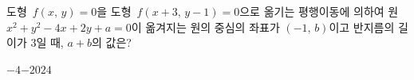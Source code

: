 도형~$f(x,\,y)=0$을 도형~$f(x+3,\,y-1)=0$으로 옮기는 평행이동에 의하여 원~$x^2+y^2-4x+2y+a=0$이 옮겨지는 원의 중심의 좌표가 $(-1,\,b)$이고 반지름의 길이가 $3$일 때, $a+b$의 값은? 
\begin{choices32}{$-4$}{$-2$}{$0$}{$2$}{$4$}\end{choices32}
